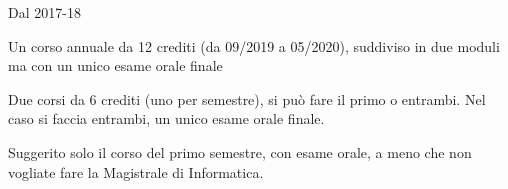 \begin{frame}{Dal 2017-18}

\vspace{-9pt}
\begin{myboxtitle}
\BI
\item Un corso \alert{annuale} da 12 crediti (da 09/2019 a 05/2020), suddiviso in due moduli ma con un unico esame orale finale
\EI
\end{myboxtitle}

\begin{myboxtitle}
\BI
\item Due corsi da 6 crediti (uno per semestre), si può fare il primo o entrambi. Nel caso si faccia entrambi, un unico esame orale finale.
\EI
\end{myboxtitle}

\begin{myboxtitle}
\BI
\item Suggerito solo il corso del primo semestre, con esame orale, a meno che non vogliate fare la Magistrale di Informatica.
\EI
\end{myboxtitle}
  
\end{frame}


